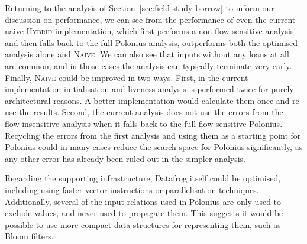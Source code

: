 \documentclass[11pt,a4paper,twoside,openany]{report}
\renewcommand\_{\textunderscore\allowbreak}
\begin{document}
Returning to the analysis of Section~\ref{sec:field-study-borrow} to inform our
discussion on performance, we can see from the performance of even the current
naive \textsc{Hybrid} implementation, which first performs a non-flow sensitive
analysis and then falls back to the full Polonius analysis, outperforms both the
optimised analysis alone and \textsc{Naive}. We can also see that inputs without
any loans at all are common, and in those cases the analysis can typically
terminate very early. Finally, \textsc{Naive} could be improved in two ways.
First, in the current implementation initialisation and liveness analysis is
performed twice for purely architectural reasons. A better implementation would
calculate them once and re-use the results. Second, the current analysis does
not use the errors from the flow-insensitive analysis when it falls back to the
full flow-sensitive Polonius. Recycling the errors from the first analysis and
using them as a starting point for Polonius could in many cases reduce the
search space for Polonius significantly, as any other error has already been
ruled out in the simpler analysis.

Regarding the supporting infrastructure, Datafrog itself could be optimised,
including using faster vector instructions or parallelisation techniques.
Additionally, several of the input relations used in Polonius are only used to
exclude values, and never used to propagate them. This suggests it would be
possible to use more compact data structures for representing them, such as
Bloom filters.
\end{document}
